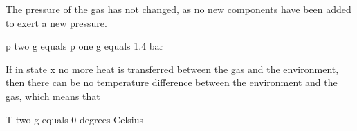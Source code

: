 The pressure of the gas has not changed, as no new components have been added to exert a new pressure.

p two g equals p one g equals 1.4 bar

If in state x no more heat is transferred between the gas and the environment, then there can be no temperature difference between the environment and the gas, which means that

T two g equals 0 degrees Celsius